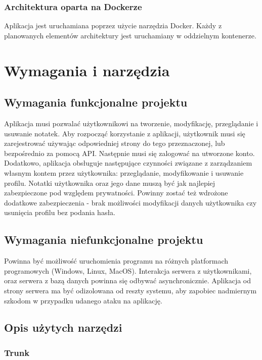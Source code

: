 \documentclass[a4paper,twoside,12pt]{book}
\begin{document}
\subsection{Architektura oparta na Dockerze}
Aplikacja jest uruchamiana poprzez użycie narzędzia Docker.
Każdy z planowanych elementów architektury jest uruchamiany w oddzielnym kontenerze.



\chapter{Wymagania i narzędzia}
\label{ch:wymagania-i-narzedzia}

\section{Wymagania funkcjonalne projektu}
Aplikacja musi pozwalać użytkownikowi na tworzenie, modyfikację, przeglądanie i usuwanie notatek.
Aby rozpocząć korzystanie z aplikacji, użytkownik musi się zarejestrować używając odpowiedniej strony do tego
przeznaczonej, lub bezpośrednio za pomocą API. Następnie musi się zalogować na utworzone konto.
Dodatkowo, aplikacja obsługuje następujące czynności związane z zarządzaniem własnym kontem przez użytkownika:
przeglądanie, modyfikowanie i usuwanie profilu.
Notatki użytkownika oraz jego dane muszą być jak najlepiej zabezpieczone pod względem prywatności.
Powinny zostać też wdrożone dodatkowe zabezpieczenia - brak możliwości modyfikacji danych użytkownika
czy usunięcia profilu bez podania hasła. 

\section{Wymagania niefunkcjonalne projektu}
Powinna być możliwość uruchomienia programu na różnych platformach programowych (Windows, Linux, MacOS).
Interakcja serwera z użytkownikami, oraz serwera z bazą danych powinna się odbywać asynchronicznie.
Aplikacja od strony serwera ma być odizolowana od reszty systemu, aby zapobiec nadmiernym szkodom w 
przypadku udanego ataku na aplikację.

\section{Opis użytych narzędzi}
\subsection{Trunk}
\end{document}
